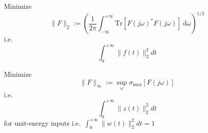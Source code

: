 Minimize
\begin{equation*}
    \|F\|_{2}:={\left(\frac{1}{2\pi}\int_{-\infty}^{+\infty}\mathrm{Tr}[{F(j\omega)}^{*}F(j\omega)]\mathrm{~d}\omega\right)}^{1/2}
\end{equation*}
i.e.\
\begin{equation*}
    \int_0^{+\infty}\|f(t)\|_2^2dt
\end{equation*}

\newpar{}

Minimize
\begin{equation*}
    \|F\|_\infty:=\sup_\omega\sigma_{\max}[F(j\omega)]
\end{equation*}
i.e.\
\begin{equation*}
    \int_0^{+\infty}\|z(t)\|_2^2dt
\end{equation*}
for unit-energy inputs i.e.\ $\int_0^{+\infty}\|w(t)\|_2^2 dt=1$

